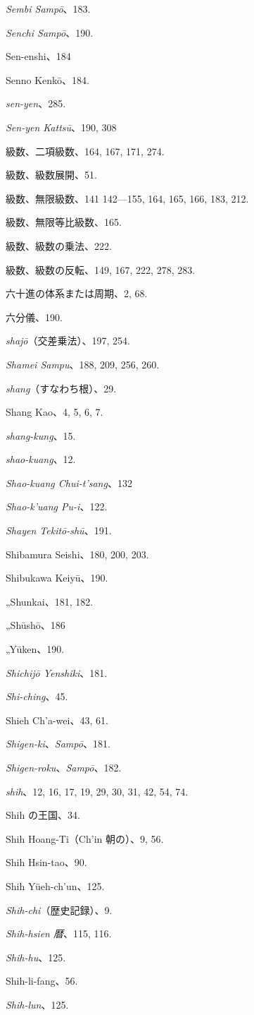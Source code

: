 \documentclass[11pt]{article}
\begin{document}
\emph{Sembi Sampō}、183.\par
\emph{Senchi Sampō}、190.\par
Sen-enshi、184\par
Senno Kenkō、184.\par
\emph{sen-yen}、285.\par
\emph{Sen-yen Kattsū}、190, 308\par
級数、二項級数、164, 167, 171, 274.\par
級数、級数展開、51.\par
級数、無限級数、141 142—155, 164, 165, 166, 183, 212.\par
級数、無限等比級数、165.\par
級数、級数の乗法、222.\par
級数、級数の反転、149, 167, 222, 278, 283.\par
六十進の体系または周期、2, 68.\par
六分儀、190.\par
\emph{shajō}（交差乗法）、197, 254.\par
\emph{Shamei Sampu}、188, 209, 256, 260.\par
\emph{shang}（すなわち根）、29.\par
Shang Kao、4, 5, 6, 7.\par
\emph{shang-kung}、15.\par
\emph{shao-kuang}、12.\par
\emph{Shao-kuang Chui-t'sang}、132\par
\emph{Shao-k'uang Pu-i}、122.\par
\emph{Shayen Tekitō-shū}、191.\par
Shibamura Seishi、180, 200, 203.\par
Shibukawa Keiyū、190.\par
\quad „\quad Shunkai、181, 182.\par
\quad „\quad Shūshō、186\par
\quad „\quad Yūken、190.\par
\emph{Shichijō Yenshiki}、181.\par
\emph{Shi-ching}、45.\par
Shieh Ch'a-wei、43, 61.\par
\emph{Shigen-ki}、\emph{Sampō}、181.\par
\emph{Shigen-roku}、\emph{Sampō}、182.\par
\emph{shih}、12, 16, 17, 19, 29, 30, 31, 42, 54, 74.\par
Shih の王国、34.\par
Shih Hoang-Ti（Ch'in 朝の）、9, 56.\par
Shih Hsin-tao、90.\par
Shih Yüeh-ch'un、125.\par
\emph{Shih-chi}（歴史記録）、9.\par
\emph{Shih-hsien 暦}、115, 116.\par
\emph{Shih-hu}、125.\par
Shih-li-fang、56.\par
\emph{Shih-lun}、125.\par
\end{document}
